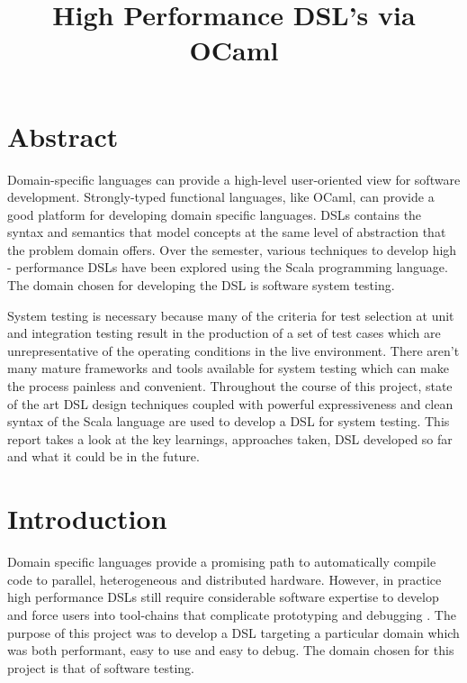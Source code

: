 \documentclass[12 pt]{article}
\title{High Performance DSL's via OCaml}
\begin{document}

\maketitle

\tableofcontents

\newpage
\section{Abstract}
Domain-specific languages can provide a high-level user-oriented view for software development. Strongly-typed functional languages, like OCaml, can provide a good platform for developing domain specific languages. DSLs contains the syntax and semantics that model concepts at the same level of abstraction that the problem domain offers. Over the semester, various techniques to develop high - performance DSLs have been explored using the Scala programming language. The domain chosen for developing the DSL is software system testing.
\bigskip

\noindent
System testing is necessary because many of the criteria for test selection at unit and integration testing result in the production of a set of test cases which are unrepresentative of the operating conditions in the live environment. There aren't many mature frameworks and tools available for system testing which can make the process painless and convenient. Throughout the course of this project, state of the art DSL design techniques coupled with powerful expressiveness and clean syntax of the Scala language are used to develop a DSL for system testing. This report takes a look at the key learnings, approaches taken, DSL developed so far and what it could be in the future.

\newpage
\section{Introduction}

\noindent
Domain specific languages provide a promising path to automatically compile code to parallel, heterogeneous and distributed hardware. However, in practice high performance DSLs still require considerable software expertise to develop and force users into tool-chains that complicate  prototyping and debugging \cite{delite}. The purpose of this project was to develop a DSL targeting a particular domain which was both performant, easy to use and easy to debug. The domain chosen for this project is that of software testing.
\end{document}
